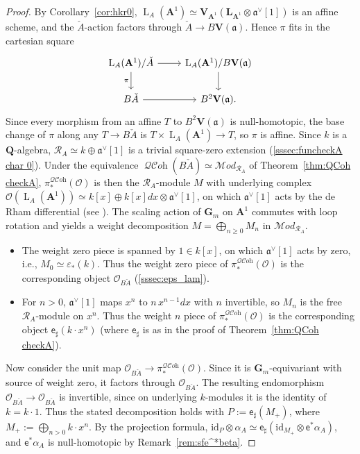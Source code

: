 \documentclass[12pt, oneside]{amsart}
\numberwithin{equation}{section}
\theoremstyle{remark}
\theoremstyle{plain}
\renewcommand{\ge}{\geqslant}
\newcommand{\MOD}{\mathcal{M}\textit{od}}
\DeclareMathOperator{\QCOH}{\mathcal{QC}\textit{oh}}
\newcommand{\R}{\mathcal{R}}
\newcommand{\RA}{\R_A}
\newcommand{\fra}{\mathfrak{a}}
\newcommand{\frav}{\mathfrak{a}^\vee}
\newcommand{\Loop}{\operatorname{L}}
\newcommand{\OO}{\mathcal{O}}
\newcommand{\GGm}{\mathbf{G}_{m}}
\newcommand{\id}{\mathrm{id}}
\newcommand{\aff}{\mathbf{A}^1}
\newcommand{\LL}{\mathbf{L}}
\newcommand{\eps}{\varepsilon}
\newcommand{\sfe}{\mathsf{e}}
\begin{document}
\begin{proof}
By Corollary~\ref{cor:hkr0}, $\Loop_A(\aff) \simeq \mathbf{V}_{\aff}(\LL_{\aff} \otimes \frav[1])$ is an affine scheme, and the $\check{A}$-action factors through $\check{A} \to B\mathbf{V}(\fra)$.
Hence $\pi$ fits in the cartesian square
\[\begin{tikzcd}
\Loop_A(\aff)/\check{A} \arrow{r} \arrow[swap]{d}{\pi} & \Loop_A(\aff)/B\mathbf{V}(\fra) \arrow{d} \\
B\check{A} \arrow{r} & B^2\mathbf{V}(\fra).
\end{tikzcd}\]
Since every morphism from an affine $T$ to $B^2\mathbf{V}(\fra)$ is null-homotopic, the base change of $\pi$ along any $T \to B\check{A}$ is $T \times \Loop_A(\aff) \to T$, so $\pi$ is affine.
Since $k$ is a $\mathbf{Q}$-algebra, $\RA \simeq k \oplus \frav[1]$ is a trivial square-zero extension (\ref{sssec:funcheckA char 0}).
Under the equivalence $\QCOH(B\check{A}) \simeq \MOD_{\RA}$ of Theorem~\ref{thm:QCoh checkA}, $\pi^{\QCOH}_*(\OO)$ is then the $\RA$-module $M$ with underlying complex $\OO(\Loop_A(\aff)) \simeq k[x] \oplus k[x]dx \otimes \frav[1]$, on which $\frav[1]$ acts by the de Rham differential (see \cite[Prop.~1.2]{BNloop}).
The scaling action of $\GGm$ on $\aff$ commutes with loop rotation and yields a weight decomposition $M = \bigoplus_{n \ge 0} M_n$ in $\MOD_{\RA}$.
\begin{itemize}
\item The weight zero piece is spanned by $1 \in k[x]$, on which $\frav[1]$ acts by zero, i.e., $M_0 \simeq \eps_*(k)$.
Thus the weight zero piece of $\pi^{\QCOH}_*(\OO)$ is the corresponding object $\OO_{B\check{A}}$ (\ref{sssec:eps_lam}).

\item For $n > 0$, $\frav[1]$ maps $x^n$ to $n\,x^{n-1}dx$ with $n$ invertible, so $M_n$ is the free $\RA$-module on $x^n$.
Thus the weight $n$ piece of $\pi^{\QCOH}_*(\OO)$ is the corresponding object $\sfe_\sharp(k \cdot x^n)$ (where $\sfe_\sharp$ is as in the proof of Theorem~\ref{thm:QCoh checkA}).
\end{itemize}
Now consider the unit map $\OO_{B\check{A}} \to \pi^{\QCOH}_*(\OO)$.
Since it is $\GGm$-equivariant with source of weight zero, it factors through $\OO_{B\check{A}}$.
The resulting endomorphism $\OO_{B\check{A}} \to \OO_{B\check{A}}$ is invertible, since on underlying $k$-modules it is the identity of $k = k \cdot 1$.
Thus the stated decomposition holds with $P := \sfe_\sharp(M_+)$, where $M_+ := \bigoplus_{n>0} k \cdot x^n$.
By the projection formula, $\id_P \otimes \alpha_A \simeq \sfe_\sharp(\id_{M_+} \otimes \sfe^*\alpha_A)$, and $\sfe^*\alpha_A$ is null-homotopic by Remark~\ref{rem:sfe^*beta}.
\end{proof}
\end{document}

